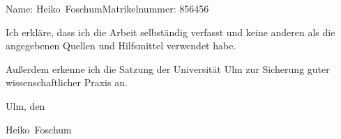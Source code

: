 \documentclass[a4paper,10pt,twoside,openright,DIV=15,BCOR25mm
]{scrbook}
\newcommand{\fullname}{Heiko~Foschum}
\newcommand{\matnr}{856456}
\begin{document}
\appendix
%

\backmatter


\nocite{*}
\listoffigures
\listoftables
\clearpage
\thispagestyle{empty}

Name: \fullname \hfill Matrikelnummer: \matnr \vspace{2cm}


Ich erkläre, dass ich die Arbeit selbständig verfasst und keine anderen als die angegebenen Quellen und Hilfsmittel verwendet habe.

Außerdem erkenne ich die Satzung der Universität Ulm zur Sicherung guter wissenschaftlicher Praxis an.\vspace{2cm}

Ulm, den \dotfill

\hspace{10cm} {\footnotesize \fullname}
\end{document}
